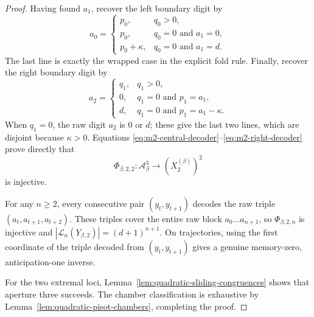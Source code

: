 \begin{proof}
Having found $a_1$, recover the left boundary digit by
\begin{equation}
a_0=
\begin{cases}
p_0,&q_0>0,\\
p_0,&q_0=0\text{ and }a_1=0,\\
p_0+\kappa,&q_0=0\text{ and }a_1=d.
\end{cases}
\label{eq:m2-left-decoder}
\end{equation}
The last line is exactly the wrapped case in the explicit fold rule.  Finally,
recover the right boundary digit by
\begin{equation}
a_2=
\begin{cases}
q_1,&q_1>0,\\
0,&q_1=0\text{ and }p_1=a_1,\\
d,&q_1=0\text{ and }p_1=a_1-\kappa.
\end{cases}
\label{eq:m2-right-decoder}
\end{equation}
When $q_1=0$, the raw digit $a_2$ is $0$ or $d$; these give the last two
lines, which are disjoint because $\kappa>0$.  Equations
\eqref{eq:m2-central-decoder}--\eqref{eq:m2-right-decoder} prove directly that
\[
\Phi_{\beta,2,2}:\mathcal A_\beta^3
\longrightarrow (X_2^{(\beta)})^2
\]
is injective.

For any $n\ge2$, every consecutive pair $(y_t,y_{t+1})$ decodes the raw
triple $(a_t,a_{t+1},a_{t+2})$.  These triples cover the entire raw block
$a_0\ldots a_{n+1}$, so $\Phi_{\beta,2,n}$ is injective and
$|\mathcal L_n(Y_{\beta,2})|=(d+1)^{n+1}$.  On trajectories, using the first
coordinate of the triple decoded from $(y_t,y_{t+1})$ gives a genuine
memory-zero, anticipation-one inverse.

For the two extremal loci, Lemma~\ref{lem:quadratic-sliding-congruences} shows
that aperture three succeeds.  The chamber classification is exhaustive by
Lemma~\ref{lem:quadratic-pisot-chambers}, completing the proof.
\end{proof}

